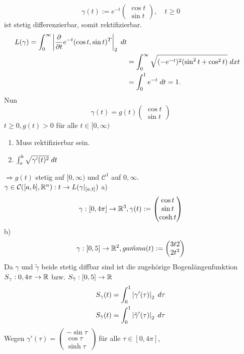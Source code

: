 \documentclass[../ana2u.tex]{subfiles}
\begin{document}
\begin{bsp}
    \[ \gamma(t) := e^{-t} \begin{pmatrix} \cos t \\ \sin t \end{pmatrix}, \quad t \geq 0 \] 
    ist stetig differenzierbar, somit rektifizierbar.
    \begin{align*}
        L(\gamma) = \integralx{ \abs{ \ddxpartial{t} e^{-t}(\cos t, \sin t)^T }_2 }{0}{\infty}{t}\\
        &= \integral{ \sqrt{(-e^{-t})^2 (\sin^2 t + \cos^2 t)} }{0}{\infty}{t} \\
        &= \integralx{e^{-t}}{0}{1}{t} = 1.
    \end{align*}
    Nun 
    \[ \gamma(t) = g(t) \begin{pmatrix} \cos t \\ \sin t \end{pmatrix} \]
    \( t \geq 0, g(t) > 0 \) für alle \( t \in [0,\infty) \)
    \begin{enumerate}
        \item Muss rektifizierbar sein. 
        \item \(\integralx{\sqrt{\gamma'(t)^2}}{a}{b}{t}\)
    \end{enumerate}
    \(\Rightarrow g(t)\) stetig auf \([0, \infty)\) und \(\mathcal{C}^1\)
    auf \(0, \infty\).\\
    \(\abb{\gamma \in \mathcal{C}([a,b], \R^n)}{t}{L(\gamma\vert_{[a,t]})}\)
    a) \[\abb{\gamma} {[0,4\pi]}{\R^3}, \gamma(t) := \begin{pmatrix}
        \cos t \\ \sin t \\ \cosh t
    \end{pmatrix} \]
    b) \[\abb{\gamma}{[0,5]}{\R^2}, \tilde{gamma}(t) := \begin{pmatrix}
        3t2 \\ 2t^3
    \end{pmatrix} \]
    Da \(\gamma\) und \(\tilde{\gamma}\) beide stetig diffbar sind ist die zugehörige Bogenlängenfunktion
    \(\abb{S_\gamma}{0, 4\pi}{\R}\) bzw. \(\abb{S_{\tilde{\gamma}}}{[0,5]}{\R}\)    
    \begin{align*}
        S_\gamma(t) &= \integralx{\abs{\gamma'(\tau)}_2}{0}{1}{\tau} \\        
        S_{\tilde{\gamma}}(t) &= \integralx{\abs{\tilde{\gamma}'(\tau)}_2}{0}{1}{\tau}
    \end{align*}
    Wegen \( \gamma'(\tau) = \begin{pmatrix} -\sin \tau \\ \cos \tau \\ \sinh \tau \end{pmatrix} \) für alle \( \tau \in [0,4\pi] \), 

\end{bsp}
\end{document}

